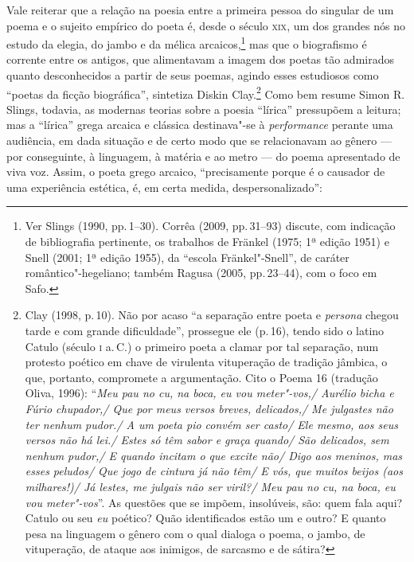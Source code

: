 
Vale reiterar que a relação na poesia entre a primeira pessoa do
singular de um poema e o sujeito empírico do poeta é, desde o século \textsc{xix}, um
dos grandes nós no estudo da elegia, do jambo e da mélica arcaicos,\footnote{
Ver Slings (1990, pp.\,1--30). Corrêa (2009, pp.\,31--93) discute, com indicação de
bibliografia pertinente, os trabalhos de Fränkel (1975; 1ª edição
1951) e Snell (2001; 1ª edição 1955), da “escola Fränkel"-Snell”, de
caráter romântico"-hegeliano; também Ragusa (2005, pp.\,23--44), com o foco em
Safo.} mas que o biografismo é corrente entre os antigos, que alimentavam a
imagem dos poetas tão admirados quanto desconhecidos a partir de seus poemas,
agindo esses estudiosos como “poetas da ficção biográfica”, sintetiza Diskin
Clay.\footnote{ Clay (1998, p.\,10). Não por acaso “a separação entre poeta e
\emph{persona} chegou tarde e com grande dificuldade”, prossegue ele (p.\,16),
tendo sido o latino Catulo (século \textsc{i} a.\,C.) o primeiro poeta a clamar por tal
separação, num protesto poético em chave de virulenta vituperação de tradição
jâmbica, o que, portanto, compromete a argumentação. Cito o Poema 16 (tradução
Oliva, 1996): ``\emph{Meu pau no cu, na boca, eu vou meter"-vos,/ Aurélio bicha
e Fúrio chupador,/ Que por meus versos breves, delicados,/ Me julgastes não
ter nenhum pudor./ A um poeta pio convém ser casto/ Ele mesmo, aos seus
versos não há lei./ Estes só têm sabor e graça quando/ São delicados, sem
nenhum pudor,/ E quando incitam o que excite não/ Digo aos meninos, mas esses
peludos/ Que jogo de cintura já não têm/ E vós, que muitos beijos (aos
milhares!)/ Já lestes, me julgais não ser viril?/ Meu pau no cu, na boca, eu
vou meter"-vos}''. As questões que se impõem, insolúveis, são: quem fala
aqui? Catulo ou seu \emph{eu} poético? Quão identificados estão um e outro? E quanto
pesa na linguagem o gênero com o qual dialoga o poema, o jambo, de vituperação,
de ataque aos inimigos, de sarcasmo e de sátira?} Como bem resume Simon R. Slings, 
todavia, as modernas teorias sobre a poesia “lírica”
pressupõem a leitura; mas a “lírica” grega arcaica e clássica destinava"-se à
\emph{performance} perante uma audiência, em dada situação e de certo modo
que se relacionavam ao gênero --- por conseguinte, à linguagem, à matéria e ao
metro --- do poema apresentado de viva voz. Assim, o poeta grego arcaico,
“precisamente porque é o causador de uma experiência estética, é, em certa
medida, despersonalizado”:

